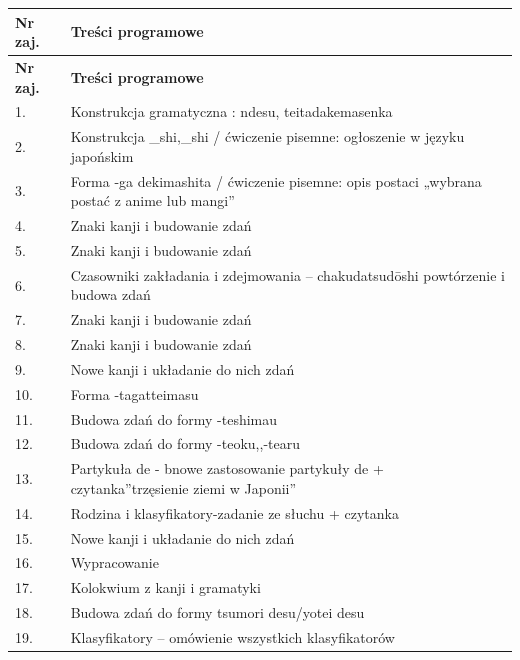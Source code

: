 \documentclass[12pt, a4paper]{article}
\newcommand{\thdrule}{\noalign{\global\setlength{\extrarowheight}{0pt}}}
\newcommand{\thdend}{\noalign{\global\setlength{\extrarowheight}{3pt}}}
\begin{document}
{\scriptsize
\begin{longtable}{m{1.5cm}m{14.5cm}}
\thdrule\toprule
\rowcolor{pjatkRed} {\color{white}\textbf{Nr zaj.}} & {\color{white}\textbf{Treści programowe}} \\
\midrule\thdend
\endfirsthead
\thdrule\toprule
\rowcolor{pjatkRed} {\color{white}\textbf{Nr zaj.}} & {\color{white}\textbf{Treści programowe}} \\
\midrule\thdend
\endhead
  \rowcolor{tableRowLight} 1. & Konstrukcja gramatyczna : ndesu, teitadakemasenka \\
  \rowcolor{tableRowAlt} 2. & Konstrukcja \_shi,\_shi / ćwiczenie pisemne: ogłoszenie w języku japońskim \\
  \rowcolor{tableRowLight} 3. & Forma -ga dekimashita / ćwiczenie pisemne: opis postaci „wybrana postać z anime lub mangi” \\
  \rowcolor{tableRowAlt} 4. & Znaki kanji  i budowanie zdań \\
  \rowcolor{tableRowLight} 5. & Znaki kanji i budowanie zdań \\
  \rowcolor{tableRowAlt} 6. & Czasowniki zakładania i zdejmowania – chakudatsudōshi powtórzenie i budowa zdań \\
  \rowcolor{tableRowLight} 7. & Znaki kanji i budowanie zdań \\
  \rowcolor{tableRowAlt} 8. & Znaki kanji i budowanie zdań \\
  \rowcolor{tableRowLight} 9. & Nowe kanji i układanie do nich zdań \\
  \rowcolor{tableRowAlt} 10. & Forma -tagatteimasu \\
  \rowcolor{tableRowLight} 11. & Budowa zdań do formy -teshimau \\
  \rowcolor{tableRowAlt} 12. & Budowa zdań do formy -teoku,,-tearu \\
  \rowcolor{tableRowLight} 13. & Partykuła de -  bnowe zastosowanie partykuły de + czytanka”trzęsienie ziemi w Japonii” \\
  \rowcolor{tableRowAlt} 14. & Rodzina i klasyfikatory-zadanie ze słuchu + czytanka \\
  \rowcolor{tableRowLight} 15. & Nowe kanji i układanie do nich zdań \\
  \rowcolor{tableRowAlt} 16. & Wypracowanie \\
  \rowcolor{tableRowLight} 17. & Kolokwium z kanji i gramatyki \\
  \rowcolor{tableRowAlt} 18. & Budowa zdań do formy tsumori desu/yotei desu \\
  \rowcolor{tableRowLight} 19. & Klasyfikatory – omówienie wszystkich klasyfikatorów \\

\end{longtable}}
\end{document}
